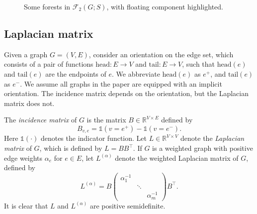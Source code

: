 \documentclass{amsart}
\theoremstyle{definition}
\newcommand{\RR}{\mathbb{R}}
\newcommand{\one}{\mathds{1}}
\newcommand{\La}{L^{(\alpha)}}
\newcommand{\tr}{\intercal}
\newcommand{\forests}{\mathcal{F}}
\begin{document}
\begin{figure}[h]
%	
%
%
\caption{Some forests in $\forests_2(G;S)$, with floating component highlighted.}
\label{fig:2-forests}
\end{figure}


\subsection{Laplacian matrix}

Given a graph $G = (V,E)$, consider an orientation on the edge set, which consists of a pair of functions $\mathrm{head}: E \to V$ and $\mathrm{tail}: E \to V$, such that $\mathrm{head}(e)$ and $\mathrm{tail}(e)$ are the endpoints of $e$.
We abbreviate $\mathrm{head}(e)$ as $e^+$, and $\mathrm{tail}(e)$ as $e^-$.
We assume all graphs in the paper are equipped with an implicit orientation.
The incidence matrix depends on the orientation, but the Laplacian matrix does not.

The {\em incidence matrix} of $G$ is the matrix $B \in \RR^{V \times E}$ defined by
\[
	B_{v, e} = \one(v = e^+) - \one(v = e^-).
\]
Here $\one(\cdot)$ denotes the indicator function.
Let $L \in \RR^{V \times V}$ denote the {\em Laplacian matrix} of $G$, which is defined by
$
	L = B B^\tr.
$
If $G$ is a weighted graph with positive edge weights $\alpha_e$ for $e \in E$,
let $\La$ denote the weighted Laplacian matrix of $G$,
defined by
\begin{equation}
\label{eq:weighted-laplacian}
	\La = B \begin{pmatrix}
	\alpha_1^{-1} & & \\
	& \ddots & \\
	& & \alpha_m^{-1}
	\end{pmatrix} B^\tr .
\end{equation}
It is clear that $L$ and $\La$ are positive semidefinite.
\end{document}
